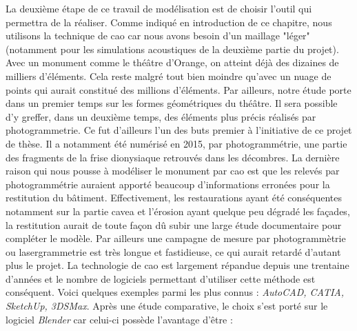 La deuxième étape de ce travail de modélisation est de choisir l'outil qui permettra de la réaliser. Comme indiqué en introduction de ce chapitre, nous utilisons la technique de \gls{cao} car nous avons besoin d'un maillage "léger" (notamment pour les simulations acoustiques de la deuxième partie du projet). Avec un monument comme le théâtre d'Orange, on atteint déjà des dizaines de milliers d'éléments. Cela reste malgré tout bien moindre qu'avec un nuage de points qui aurait constitué des millions d'éléments. Par ailleurs, notre étude porte dans un premier temps sur les formes géométriques du théâtre. Il sera possible d'y greffer, dans un deuxième temps, des éléments plus précis réalisés par photogrammetrie. Ce fut d'ailleurs l'un des buts premier à l'initiative de ce projet de thèse. Il a notamment été numérisé en 2015, par photogrammétrie, une partie des fragments de la frise dionysiaque retrouvés dans les décombres. La dernière raison qui nous pousse à modéliser le monument par \gls{cao} est que les relevés par photogrammétrie auraient apporté beaucoup d'informations erronées pour la restitution du bâtiment. Effectivement, les restaurations ayant été conséquentes notamment sur la partie  \gls{cavea} et l'érosion ayant quelque peu dégradé les façades, la restitution aurait de toute façon dû subir une large étude documentaire pour compléter le modèle. Par ailleurs une campagne de mesure par photogrammètrie ou lasergrammetrie est très longue et fastidieuse, ce qui aurait retardé d'autant plus le projet. La technologie de \gls{cao} est largement répandue depuis une trentaine d'années et le nombre de logiciels permettant d'utiliser cette méthode est conséquent. Voici quelques exemples parmi les plus connus : \textit{AutoCAD, CATIA, SketchUp, 3DSMax}. Après une étude comparative, le choix s'est porté sur le logiciel \textit{Blender} car celui-ci possède l'avantage d'être :

